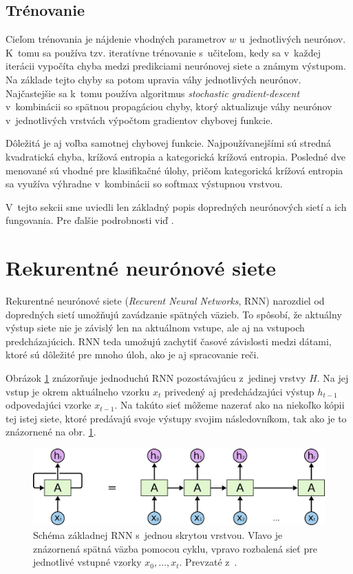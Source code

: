 \subsection*{Trénovanie}

Cieľom trénovania je nájdenie vhodných parametrov $w$ u~jednotlivých neurónov. K~tomu sa používa tzv. iteratívne trénovanie s~učiteľom, kedy sa v~každej iterácii vypočíta chyba medzi predikciami neurónovej siete a známym výstupom. Na základe tejto chyby sa potom upravia váhy jednotlivých neurónov. Najčastejšie sa k~tomu používa algoritmus \textit{stochastic gradient-descent} v~kombinácii so spätnou propagáciou chyby, ktorý aktualizuje váhy neurónov v~jednotlivých vrstvách výpočtom gradientov chybovej funkcie. 

Dôležitá je aj voľba samotnej chybovej funkcie. Najpoužívanejšími sú stredná kvadratická chyba, krížová entropia a kategorická krížová entropia. Posledné dve menované sú vhodné pre klasifikačné úlohy, pričom kategorická krížová entropia sa využíva výhradne v~kombinácii so softmax výstupnou vrstvou.

V~tejto sekcii sme uviedli len základný popis dopredných neurónových sietí a ich fungovania. Pre ďalšie podrobnosti viď \cite{Bishop2006}.

\section{Rekurentné neurónové siete} 

Rekurentné neurónové siete (\textit{Recurent Neural Networks}, RNN) narozdiel od dopredných sietí umožňujú zavádzanie spätných väzieb. To spôsobí, že aktuálny výstup siete nie je závislý len na aktuálnom vstupe, ale aj na vstupoch predcházajúcich. RNN teda umožujú zachytiť časové závislosti medzi dátami, ktoré sú dôležité pre mnoho úloh, ako je aj spracovanie reči.

Obrázok \ref{fig:RNN-diagram} znázorňuje jednoduchú RNN pozostávajúcu z~jedinej vrstvy $H$. Na jej vstup je okrem aktuálneho vzorku $x_t$ privedený aj predchádzajúci výstup $h_{t-1}$ odpovedajúci vzorke $x_{t-1}$. Na takúto sieť môžeme nazerať ako na niekoľko kópii tej istej siete, ktoré predávajú svoje výstupy svojim následovníkom, tak ako je to znázornené na obr. \ref{fig:RNN-diagram}.

\begin{figure}[ht!]
    \centering
    \includegraphics[width=.8\textwidth]{figures/RNN-unrolled.png}
    \caption{Schéma základnej RNN s~jednou skrytou vrstvou. Vľavo je znázornená spätná väzba pomocou cyklu, vpravo rozbalená sieť pre jednotlivé vstupné vzorky $x_0, \dots, x_t$. Prevzaté z~\cite{Olah2015}.}
    \label{fig:RNN-diagram}
\end{figure}

